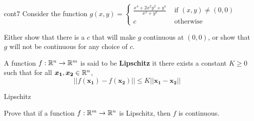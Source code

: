 \begin{problem}{cont7}
Consider the function  $g(x,y) = \left\{
		\begin{array}{ll}
			\frac{x^4  +2x^2y^2 +y^4}{x^2 + y^2} & \text{ if } (x,y) \neq (0,0) \\
			c & \text{ otherwise } 
		\end{array}
		\right.$
		
		Either show that there is a $c$ that will make $g$ continuous at $(0,0)$, or show that $g$ will not be continuous for any choice of $c$.
\end{problem}

\begin{definition}
A function $f : \mathbb{R}^n \to \mathbb{R}^m$ is said to be \textbf{Lipschitz} it there exists a constant $K \geq 0$ such that for all $\bm{x_1},\bm{x_2} \in \mathbb{R}^n$,  $$||f(\bm{x_1}) - f(\bm{x_2})|| \leq K ||\bm{x_1} - \bm{x_2}|| $$
\end{definition}

\begin{problem}{Lipschitz}

    Prove that if a function $f : \mathbb{R}^m \to \mathbb{R}^n$ is Lipschitz, then $f$ is continuous.

\end{problem}
    